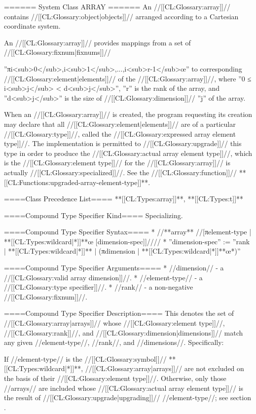 ====== System Class ARRAY ======
An //[[CL:Glossary:array]]// contains //[[CL:Glossary:object|objects]]// arranged according to a Cartesian coordinate system.

An //[[CL:Glossary:array]]// provides mappings from a set of //[[CL:Glossary:fixnum|fixnums]]//

''πi<sub>0</sub>,i<sub>1</sub>,...,i<sub>r-1</sub>œ'' to corresponding //[[CL:Glossary:element|elements]]// of the //[[CL:Glossary:array]]//, where ''0 ≤ i<sub>j</sub> < d<sub>j</sub>'', ''r'' is the rank of the array, and ''d<sub>j</sub>'' is the size of //[[CL:Glossary:dimension]]// ''j'' of the array.

When an //[[CL:Glossary:array]]// is created, the program requesting its creation may declare that all //[[CL:Glossary:element|elements]]// are of a particular //[[CL:Glossary:type]]//, called the //[[CL:Glossary:expressed array element type]]//. The implementation is permitted to //[[CL:Glossary:upgrade]]// this type in order to produce the //[[CL:Glossary:actual array element type]]//, which is the //[[CL:Glossary:element type]]// for the //[[CL:Glossary:array]]// is actually //[[CL:Glossary:specialized]]//. See the //[[CL:Glossary:function]]// **[[CL:Functions:upgraded-array-element-type]]**.

====Class Precedence List====
**[[CL:Types:array]]**, **[[CL:Types:t]]**

====Compound Type Specifier Kind====
Specializing.

====Compound Type Specifier Syntax====
  * //**array** //[πelement-type | **[[CL:Types:wildcard|*]]**œ [dimension-spec]]////
  * ''dimension-spec'' := ''rank | **[[CL:Types:wildcard|*]]** | (πdimension | **[[CL:Types:wildcard|*]]**œ*)''

====Compound Type Specifier Arguments====
  * //dimension// - a //[[CL:Glossary:valid array dimension]]//.
  * //element-type// - a //[[CL:Glossary:type specifier]]//.
  * //rank// - a non-negative //[[CL:Glossary:fixnum]]//.

====Compound Type Specifier Description====
This denotes the set of //[[CL:Glossary:array|arrays]]// whose //[[CL:Glossary:element type]]//, //[[CL:Glossary:rank]]//, and //[[CL:Glossary:dimension|dimensions]]// match any given //element-type//, //rank//, and //dimensions//. Specifically:

If //element-type// is the //[[CL:Glossary:symbol]]// **[[CL:Types:wildcard|*]]**, //[[CL:Glossary:array|arrays]]// are not excluded on the basis of their //[[CL:Glossary:element type]]//. Otherwise, only those //arrays// are included whose //[[CL:Glossary:actual array element type]]// is the result of //[[CL:Glossary:upgrade|upgrading]]// //element-type//; see section {\secref\ArrayUpgrading}.

